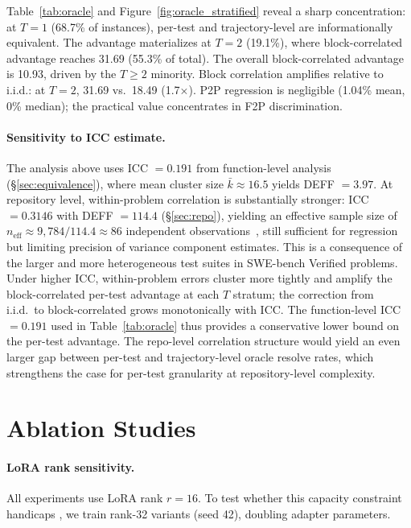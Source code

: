 Table~\ref{tab:oracle} and Figure~\ref{fig:oracle_stratified} reveal a sharp concentration: at $T = 1$ (68.7\% of instances), per-test and trajectory-level are informationally equivalent. The advantage materializes at $T = 2$ (19.1\%), where block-correlated advantage reaches 31.69\pp{} (55.3\% of total). The overall block-correlated advantage is 10.93\pp{}, driven by the $T \geq 2$ minority. Block correlation amplifies relative to i.i.d.: at $T = 2$, 31.69\pp{} vs.\ 18.49\pp{} (1.7$\times$). P2P regression is negligible (1.04\% mean, 0\% median); the practical value concentrates in F2P discrimination.

\paragraph{Sensitivity to ICC estimate.}
The analysis above uses ICC $= 0.191$ from function-level analysis (\S\ref{sec:equivalence}), where mean cluster size $\bar{k} \approx 16.5$ yields DEFF $= 3.97$. At repository level, within-problem correlation is substantially stronger: ICC $= 0.3146$ with DEFF $= 114.4$ (\S\ref{sec:repo}), yielding an effective sample size of $n_{\text{eff}} \approx 9{,}784 / 114.4 \approx 86$ independent observations~\cite{moulton1990}, still sufficient for regression but limiting precision of variance component estimates. This is a consequence of the larger and more heterogeneous test suites in SWE-bench Verified problems. Under higher ICC, within-problem errors cluster more tightly and amplify the block-correlated per-test advantage at each $T$ stratum; the correction from i.i.d.\ to block-correlated grows monotonically with ICC. The function-level ICC $= 0.191$ used in Table~\ref{tab:oracle} thus provides a conservative lower bound on the per-test advantage. The repo-level correlation structure would yield an even larger gap between per-test and trajectory-level oracle resolve rates, which strengthens the case for per-test granularity at repository-level complexity.

\section{Ablation Studies}
\label{app:ablations}

\paragraph{LoRA rank sensitivity.}
All \cwm{} experiments use LoRA rank $r{=}16$. To test whether this capacity constraint handicaps \cwm{}, we train rank-32 variants (seed 42), doubling adapter parameters.

